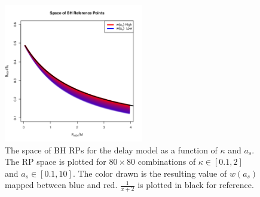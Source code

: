 %
\begin{figure} %
\vspace{-2.75cm}
\includegraphics[width=0.54\textwidth]{../ddBias/rpSpaceww.png}
\vspace{-1.5cm}
\caption{
\onehalfspacing
The space of BH RPs for the delay model as a function of $\kappa$ and $a_s$. 
The RP space is plotted for $80\times80$ combinations of $\kappa\in[0.1, 2]$ 
and $a_s\in[0.1, 10]$. The color drawn is the resulting value of $w(a_s)$ 
mapped between blue and red. 
$\frac{1}{x+2}$ is plotted in black for reference. 
%
}
\label{rpSpace}
\end{figure}


